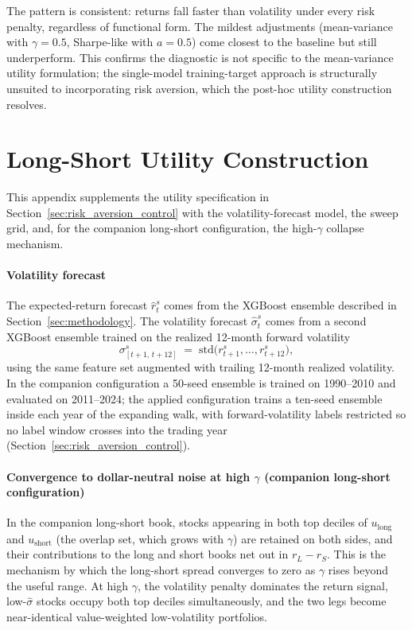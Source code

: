 

The pattern is consistent: returns fall faster than volatility under every risk penalty, regardless of functional form. The mildest adjustments (mean-variance with $\gamma = 0.5$, Sharpe-like with $a = 0.5$) come closest to the baseline but still underperform. This confirms the diagnostic is not specific to the mean-variance utility formulation; the single-model training-target approach is structurally unsuited to incorporating risk aversion, which the post-hoc utility construction resolves.

\section{Long-Short Utility Construction}\label{app:crra_construction}

This appendix supplements the utility specification in Section~\ref{sec:risk_aversion_control} with the volatility-forecast model, the sweep grid, and, for the companion long-short configuration, the high-$\gamma$ collapse mechanism.

\paragraph{Volatility forecast} The expected-return forecast $\hat r_t^s$ comes from the XGBoost ensemble described in Section~\ref{sec:methodology}. The volatility forecast $\hat\sigma_t^s$ comes from a second XGBoost ensemble trained on the realized 12-month forward volatility
\[
    \sigma^s_{[t+1,\,t+12]} \;=\; \mathrm{std}\!\big(r^s_{t+1}, \ldots, r^s_{t+12}\big),
\]
using the same feature set augmented with trailing 12-month realized volatility. In the companion configuration a 50-seed ensemble is trained on 1990--2010 and evaluated on 2011--2024; the applied configuration trains a ten-seed ensemble inside each year of the expanding walk, with forward-volatility labels restricted so no label window crosses into the trading year (Section~\ref{sec:risk_aversion_control}).

\paragraph{Convergence to dollar-neutral noise at high $\gamma$ (companion long-short configuration)} In the companion long-short book, stocks appearing in both top deciles of $u_{\text{long}}$ and $u_{\text{short}}$ (the overlap set, which grows with $\gamma$) are retained on both sides, and their contributions to the long and short books net out in $r_L - r_S$. This is the mechanism by which the long-short spread converges to zero as $\gamma$ rises beyond the useful range. At high $\gamma$, the volatility penalty dominates the return signal, low-$\hat\sigma$ stocks occupy both top deciles simultaneously, and the two legs become near-identical value-weighted low-volatility portfolios.

